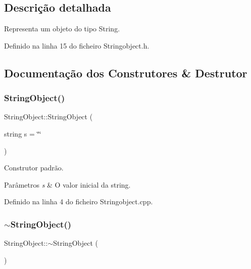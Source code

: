 \subsection{Descrição detalhada}
Representa um objeto do tipo String. 

Definido na linha 15 do ficheiro Stringobject.\+h.



\subsection{Documentação dos Construtores \& Destrutor}
\mbox{\label{classStringObject_af29d58fcfbd76c7708e5c8689321ab32}} 
\subsubsection{\texorpdfstring{String\+Object()}{StringObject()}}
{\footnotesize\ttfamily String\+Object\+::\+String\+Object (\begin{DoxyParamCaption}\item[{string}]{s = {\ttfamily \char`\"{}\char`\"{}} }\end{DoxyParamCaption})}



Construtor padrão. 


\begin{DoxyParams}{Parâmetros}
{\em s} & O valor inicial da string. \\
\hline
\end{DoxyParams}


Definido na linha 4 do ficheiro Stringobject.\+cpp.

\mbox{\label{classStringObject_a7db6683d04fe432e570458daf305500b}} 
\subsubsection{\texorpdfstring{$\sim$\+String\+Object()}{~StringObject()}}
{\footnotesize\ttfamily String\+Object\+::$\sim$\+String\+Object (\begin{DoxyParamCaption}{ }\end{DoxyParamCaption})}



